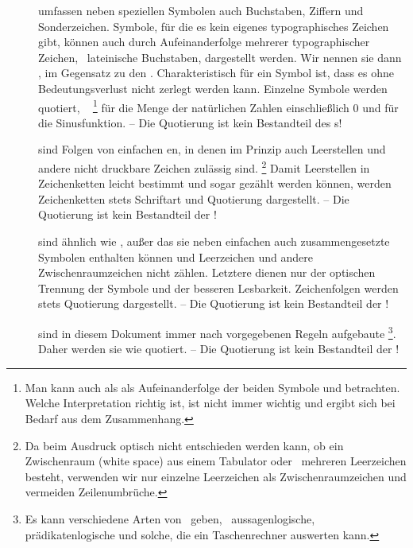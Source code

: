 \begin{description}
	\item[] umfassen neben speziellen Symbolen auch Buchstaben, Ziffern und Sonderzeichen.
	Symbole, für die es kein eigenes typographisches Zeichen gibt, können auch durch Aufeinanderfolge mehrerer typographischer Zeichen, \textiAlg\ lateinische Buchstaben, dargestellt werden.
	Wir nennen sie dann , im Gegensatz zu den .
	Charakteristisch für ein Symbol ist, dass es ohne Bedeutungsverlust nicht zerlegt werden kann.
	Einzelne Symbole werden  quotiert, \textzB\ \chrqt{$\gsNo$}%
	\footnote{%
		Man kann \chrqt{$\gsNo$} auch als als Aufeinanderfolge der beiden Symbole \chrqt{$\gsN$} und  betrachten.
		Welche Interpretation richtig ist, ist nicht immer wichtig und ergibt sich bei Bedarf aus dem Zusammenhang.
	}
	für die Menge der natürlichen Zahlen einschließlich 0 und \chrqt{$\sin$} für die Sinusfunktion.
	-- Die Quotierung ist kein Bestandteil des s!
	\item [] sind Folgen von einfachen en, in denen im Prinzip auch Leerstellen und andere nicht druckbare Zeichen zulässig sind.%
	\footnote{%
		Da beim Ausdruck optisch nicht entschieden werden kann, ob ein Zwischenraum (white space) aus einem Tabulator oder \textevtl\ mehreren Leerzeichen besteht, verwenden wir nur einzelne Leerzeichen als Zwischenraumzeichen und vermeiden Zeilenumbrüche.
	}
	Damit Leerstellen in Zeichenketten leicht bestimmt und sogar gezählt werden können,
	werden Zeichenketten stets  Schriftart und Quotierung dargestellt.
	-- Die Quotierung ist kein Bestandteil der !
	\item [] sind ähnlich wie , außer das sie neben einfachen auch zusammengesetzte Symbolen enthalten können und Leerzeichen und andere Zwischenraumzeichen nicht zählen.
	Letztere dienen nur der optischen Trennung der Symbole und der besseren Lesbarkeit.
	Zeichenfolgen werden stets  Quotierung dargestellt.
	-- Die Quotierung ist kein Bestandteil der !
	\item [\Formeln] sind in diesem Dokument immer nach vorgegebenen Regeln aufgebaute %
	\footnote{%
		Es kann verschiedene Arten von \Formeln\ geben, \textzB\ aussagenlogische, prädikatenlogische und solche, die ein Taschenrechner auswerten kann.
	}.
	Daher werden sie wie  quotiert.
	-- Die Quotierung ist kein Bestandteil der !


\end{description}
